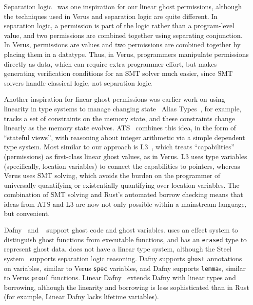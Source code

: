 Separation logic~\cite{DBLP:conf/lics/Reynolds02, DBLP:journals/tcs/OHearn07, Iris31}
was one inspiration for our linear ghost permissions,
although the techniques used in Verus and separation logic are quite different.
In separation logic, a permission is part of the logic rather than a program-level value,
and two permissions are combined together using separating conjunction.
In Verus, permissions are values and two permissions are combined together by placing them in a datatype.
Thus, in Verus, programmers manipulate permissions directly as data,
which can require extra programmer effort,
but makes generating verification conditions for an SMT solver much easier,
since SMT solvers handle classical logic, not separation logic.

Another inspiration for linear ghost permissions was earlier work on
using linearity in type systems to manage changing
state~\cite{crary1999capcalculus, smith2000aliastypes, zhu2005atsviews, morrisett2005l3}
Alias Types~\cite{smith2000aliastypes}, for example, tracks a set of constraints on the memory state,
and these constraints change linearly as the memory state evolves.
ATS~\cite{zhu2005atsviews} combines this idea, in the form of ``stateful views'',
with reasoning about integer arithmetic via a simple dependent type system.
Most similar to our approach is L3~\cite{morrisett2005l3},
which treats ``capabilities'' (permissions) as first-class linear ghost values,
as in Verus.  L3 uses type variables (specifically, location variables)
to connect the capabilities to pointers, whereas
Verus uses SMT solving, which avoids the burden on the programmer of
universally quantifying or existentially quantifying over location variables.
The combination of SMT solving and Rust's automated borrow checking means that
ideas from ATS and L3 are now not only possible within a mainstream language,
but convenient.

Dafny~\cite{DBLP:conf/lpar/Leino10} and \fstar~\cite{mumon} support ghost code and ghost variables.
\fstar uses an effect system to distinguish ghost functions from executable functions,
and has an \verb`erased` type to represent ghost data.
\fstar does not have a linear type system,
although the \fstar Steel system~\cite{DBLP:journals/pacmpl/FromherzRSGMMR21}
supports separation logic reasoning.
Dafny supports \verb`ghost` annotations on variables,
similar to Verus \verb`spec` variables,
and Dafny supports \verb`lemma`s, similar to Verus \verb`proof` functions.
Linear Dafny~\cite{DBLP:journals/pacmpl/LiLZCHPH22} extends Dafny with linear types and borrowing,
although the linearity and borrowing is less sophisticated than in Rust (for example,
Linear Dafny lacks lifetime variables).
